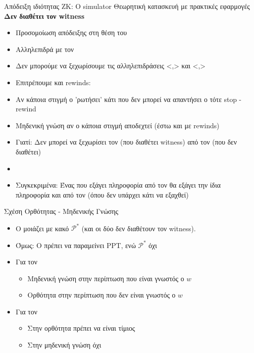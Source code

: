 \documentclass[handout]{beamer}
\begin{document}
\begin{frame}{Απόδειξη ιδιότητας ΖΚ: Ο simulator}
{Θεωρητική κατασκευή με πρακτικές εφαρμογές}
\textbf{Δεν διαθέτει τον witness}
\pause
\begin{small}
\begin{itemize}
\setlength\itemsep{0.01em}
\item Προσομοίωση απόδειξης στη θέση του \prv
\item Αλληλεπιδρά με τον \ver
\pause
\item Δεν μπορούμε να ξεχωρίσουμε τις αλληλεπιδράσεις <\siml,\ver> και <\prv,\ver>
\pause
\item Επιτρέπουμε και rewinds:
\pause
\item Αν κάποια στιγμή ο \ver 'ρωτήσει' κάτι που δεν μπορεί να απαντήσει ο \siml τότε stop - rewind
\pause
\item Μηδενική γνώση αν ο \ver κάποια στιγμή αποδεχτεί (έστω και με rewinds)
\pause
\item Γιατί: \pause
Δεν μπορεί να ξεχωρίσει τον \prv (που διαθέτει witness) από τον \siml (που δεν διαθέτει) 
\pause
\item {}
\pause
\item Συγκεκριμένα: Ένας \ver που εξάγει πληροφορία από τον \prv θα εξάγει την ίδια πληροφορία και από τον \siml (όπου δεν υπάρχει κάτι να εξαχθεί)

\end{itemize}
\end{small}
\end{frame}

\begin{frame}{Σχέση Oρθότητας - Μηδενικής Γνώσης}
\begin{itemize}
\item O \siml μοιάζει με κακό $\mathcal{P}^*$ (και οι δύο δεν διαθέτουν τον witness).
\item  Όμως: Ο \siml πρέπει να παραμείνει PPT, ενώ $\mathcal{P}^*$ όχι 
\item Για τον \prv
\begin{itemize}
\item Μηδενική γνώση στην περίπτωση που είναι γνωστός ο $w$
\item Ορθότητα στην περίπτωση που δεν είναι γνωστός ο $w$
\end{itemize}
\item Για τον \ver
\begin{itemize}
\item Στην ορθότητα πρέπει να είναι τίμιος
\item Στην μηδενική γνώση όχι
\end{itemize}

\end{itemize}
\end{frame}
\end{document}
